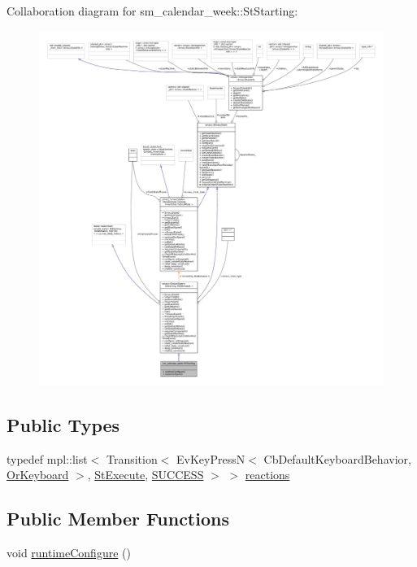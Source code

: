 Collaboration diagram for sm\+\_\+calendar\+\_\+week\+:\+:St\+Starting\+:
\nopagebreak
\begin{figure}[H]
\begin{center}
\leavevmode
\includegraphics[width=350pt]{structsm__calendar__week_1_1StStarting__coll__graph}
\end{center}
\end{figure}
\subsection*{Public Types}
\begin{DoxyCompactItemize}
\item 
typedef mpl\+::list$<$ Transition$<$ Ev\+Key\+PressN$<$ Cb\+Default\+Keyboard\+Behavior, \hyperlink{classsm__calendar__week_1_1OrKeyboard}{Or\+Keyboard} $>$, \hyperlink{structsm__calendar__week_1_1StExecute}{St\+Execute}, \hyperlink{classSUCCESS}{S\+U\+C\+C\+E\+SS} $>$ $>$ \hyperlink{structsm__calendar__week_1_1StStarting_a4f40c2e8b54ea2ca7ba60fa616dfa753}{reactions}
\end{DoxyCompactItemize}
\subsection*{Public Member Functions}
\begin{DoxyCompactItemize}
\item 
void \hyperlink{structsm__calendar__week_1_1StStarting_ad58f99b05a28d9f3aec2cb150a312c58}{runtime\+Configure} ()
\end{DoxyCompactItemize}
